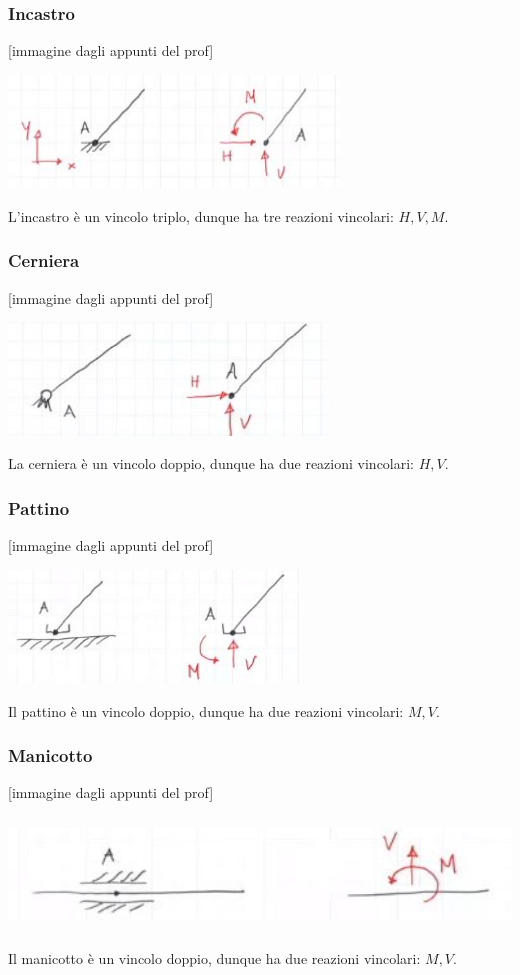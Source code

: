 \subsubsection{Incastro}
[immagine dagli appunti del prof]
\begin{center}
    \includegraphics[height=3cm]{../lezione6/img2.JPG}
\end{center}
L'incastro è un vincolo triplo, dunque ha tre reazioni vincolari: $H, V, M$.
\subsubsection{Cerniera}
[immagine dagli appunti del prof]
\begin{center}
    \includegraphics[height=3cm]{../lezione6/img3.JPG}
\end{center}
La cerniera è un vincolo doppio, dunque ha due reazioni vincolari: $H, V$.
\subsubsection{Pattino}
[immagine dagli appunti del prof]
\begin{center}
    \includegraphics[height=3cm]{../lezione6/img4.JPG}
\end{center}
Il pattino è un vincolo doppio, dunque ha due reazioni vincolari: $M, V$.
\subsubsection{Manicotto}
[immagine dagli appunti del prof]
\begin{center}
    \includegraphics[height=3cm]{../lezione6/img5.JPG}
\end{center}
Il manicotto è un vincolo doppio, dunque ha due reazioni vincolari: $M, V$.
